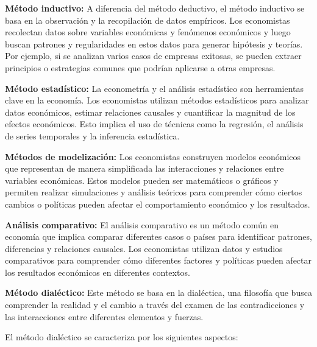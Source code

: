 \documentclass[
  jou,
  floatsintext,
  longtable,
  a4paper,
  nolmodern,
  notxfonts,
  notimes,
  12pt,
  colorlinks=true,linkcolor=blue,citecolor=blue,urlcolor=blue]{apa7}
\begin{document}
\textbf{Método inductivo:} A diferencia del método deductivo, el método
inductivo se basa en la observación y la recopilación de datos
empíricos. Los economistas recolectan datos sobre variables económicas y
fenómenos económicos y luego buscan patrones y regularidades en estos
datos para generar hipótesis y teorías. Por ejemplo, si se analizan
varios casos de empresas exitosas, se pueden extraer principios o
estrategias comunes que podrían aplicarse a otras empresas.

\textbf{Método estadístico:} La econometría y el análisis estadístico
son herramientas clave en la economía. Los economistas utilizan métodos
estadísticos para analizar datos económicos, estimar relaciones causales
y cuantificar la magnitud de los efectos económicos. Esto implica el uso
de técnicas como la regresión, el análisis de series temporales y la
inferencia estadística.

\textbf{Métodos de modelización:} Los economistas construyen modelos
económicos que representan de manera simplificada las interacciones y
relaciones entre variables económicas. Estos modelos pueden ser
matemáticos o gráficos y permiten realizar simulaciones y análisis
teóricos para comprender cómo ciertos cambios o políticas pueden afectar
el comportamiento económico y los resultados.

\textbf{Análisis comparativo:} El análisis comparativo es un método
común en economía que implica comparar diferentes casos o países para
identificar patrones, diferencias y relaciones causales. Los economistas
utilizan datos y estudios comparativos para comprender cómo diferentes
factores y políticas pueden afectar los resultados económicos en
diferentes contextos.

\textbf{Método dialéctico:} Este método se basa en la dialéctica, una
filosofía que busca comprender la realidad y el cambio a través del
examen de las contradicciones y las interacciones entre diferentes
elementos y fuerzas.

El método dialéctico se caracteriza por los siguientes aspectos:
\end{document}
